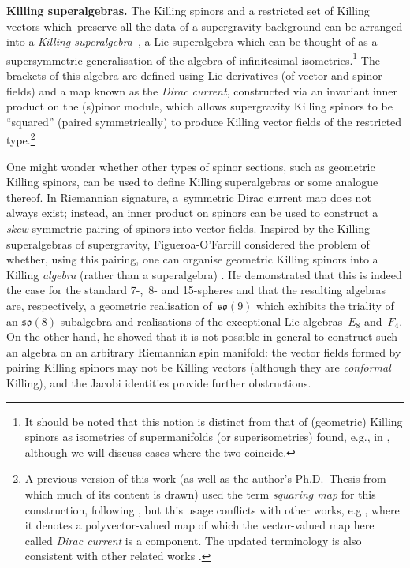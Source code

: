 \documentclass[pdftex]{sigma}
\numberwithin{equation}{section}
\newcommand{\1}{\mathbbm{1}}
\begin{document}
{\bf Killing superalgebras.}
The Killing spinors and a restricted set of Killing vectors which~preserve all the data of a supergravity background can be arranged into a \emph{Killing superalgebra}~\mbox{\cite{Figueroa-OFarrill2007_1,Figueroa-OFarrill2005}}, a Lie superalgebra which can be thought of as a supersymmetric generalisation of the algebra of infinitesimal isometries.\footnote{It should be noted that this notion is distinct from that of (geometric) Killing spinors as isometries of supermanifolds (or superisometries) found, e.g., in \cite{Alekseevsky1998}, although we will discuss cases where the two coincide.
	}
The brackets of this algebra are defined using Lie derivatives (of vector and spinor fields) and a map known as the \emph{Dirac current}, constructed via an invariant inner product on the (s)pinor module, which allows supergravity Killing spinors to be ``squared'' (paired symmetrically) to produce Killing vector fields of the restricted type.\footnote{A previous version of this work (as well as the author's Ph.D.~Thesis \cite{Beckett2024} from which much of its content is drawn) used the term \emph{squaring map} for this construction, following \cite{Figueroa-OFarrill2012,Figueroa-OFarrill2014,Hustler2016}, but this usage conflicts with other works, e.g., \cite{Cortes2021,Shahbazi2024_1} where it denotes a polyvector-valued map of which the vector-valued map here called \emph{Dirac current} is a component. The updated terminology is also consistent with other related works \cite{Beckett2021,deMedeiros2016,deMedeiros2018,Figueroa-OFarrill2017_1,Figueroa-OFarrill2017}.}

One might wonder whether other types of spinor sections, such as geometric Killing spinors, can be used to define Killing superalgebras or some analogue thereof. In Riemannian signature, a~symmetric Dirac current map does not always exist; instead, an inner product on spinors can be used to construct a \emph{skew}-symmetric pairing of spinors into vector fields. Inspired by the Killing superalgebras of supergravity, Figueroa-O'Farrill considered the problem of whether, using this pairing, one can organise geometric Killing spinors into a Killing \emph{algebra} (rather than a superalgebra) \cite{Figueroa-OFarrill2008_except}. He demonstrated that this is indeed the case for the standard \mbox{7-,}~8- and 15-spheres and that the resulting algebras are, respectively, a geometric realisation of~$\mathfrak{so}(9)$ which exhibits the triality of an $\mathfrak{so}(8)$ subalgebra and realisations of the exceptional Lie algebras~$E_8$ and~$F_4$. On the other hand, he showed that it is not possible in general to construct such an algebra on an arbitrary Riemannian spin manifold: the vector fields formed by pairing Killing spinors may not be Killing vectors (although they are \emph{conformal} Killing), and the Jacobi identities provide further obstructions.
\end{document}
